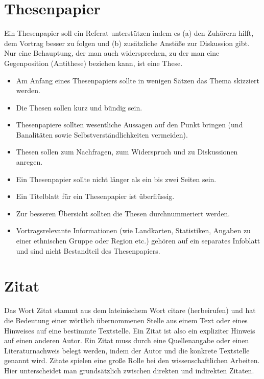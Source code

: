 \documentclass[ 12pt,
                titlepage,
                parskip=half,
                version=first,
                bibliography=totocnumbered,
                final,
                listof=totoc]{scrartcl}
\begin{document}
\section{Thesenpapier}
\label{sec:thesenpapier}

Ein Thesenpapier soll ein Referat unterstützen indem es (a) den Zuhörern hilft,
dem Vortrag besser zu folgen und (b) zusätzliche Anstöße zur Diskussion gibt.
Nur eine Behauptung, der man auch widersprechen, zu der man eine Gegenposition
(Antithese) beziehen kann, ist eine These.

\begin{itemize}
    \item Am Anfang eines Thesenpapiers sollte in wenigen Sätzen das Thema
    skizziert werden.
    \item Die Thesen sollen kurz und bündig sein.
    \item Thesenpapiere sollten wesentliche Aussagen auf den Punkt bringen (und
    Banalitäten sowie Selbstverständlichkeiten vermeiden).
    \item Thesen sollen zum Nachfragen, zum Widerspruch und zu Diskussionen
    anregen.
    \item Ein Thesenpapier sollte nicht länger als ein bis zwei Seiten sein.
    \item Ein Titelblatt für ein Thesenpapier ist überflüssig.
    \item Zur besseren Übersicht sollten die Thesen durchnummeriert werden.
    \item Vortragsrelevante Informationen (wie Landkarten, Statistiken, Angaben
    zu einer ethnischen Gruppe oder Region etc.) gehören auf ein separates
    Infoblatt und sind nicht Bestandteil des Thesenpapiers.
\end{itemize}

\section{Zitat}
\label{sec:zitat}

Das Wort Zitat stammt aus dem lateinischem Wort citare (herbeirufen) und hat die
Bedeutung einer wörtlich übernommenen Stelle aus einem Text oder eines Hinweises
auf eine bestimmte Textstelle. Ein Zitat ist also ein expliziter Hinweis auf
einen anderen Autor. Ein Zitat muss durch eine Quellenangabe oder einen
Literaturnachweis belegt werden, indem der Autor und die konkrete Textstelle
genannt wird. Zitate spielen eine große Rolle bei den wissenschaftlichen
Arbeiten. Hier unterscheidet man grundsätzlich zwischen direkten und indirekten
Zitaten.
\end{document}
